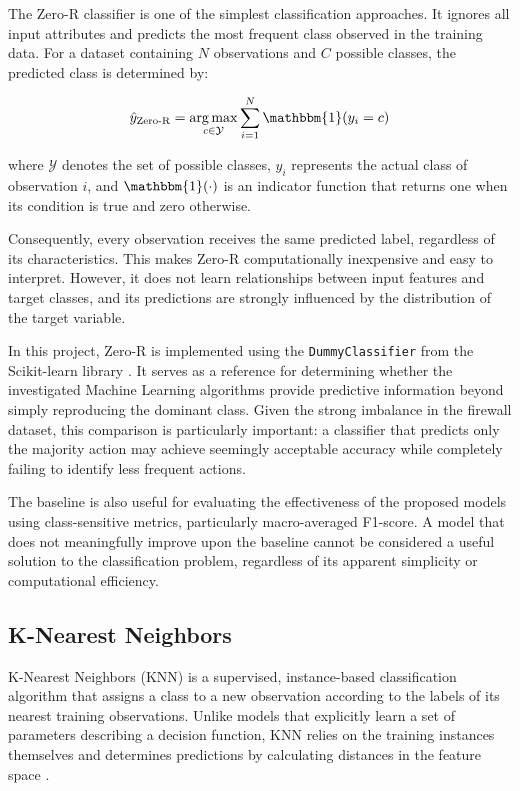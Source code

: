 The Zero-R classifier is one of the simplest classification approaches. It ignores all input attributes and predicts the most frequent class observed in the training data. For a dataset containing $N$ observations and $C$ possible classes, the predicted class is determined by:

\begin{equation}
    \hat{y}_{\text{Zero-R}}
    =
    \underset{c \in \mathcal{Y}}{\arg\max}
    \sum_{i=1}^{N}\mathbbm{1}(y_i=c)
    \label{eq:zero-r}
\end{equation}

where $\mathcal{Y}$ denotes the set of possible classes, $y_i$ represents the actual class of observation $i$, and $\mathbbm{1}(\cdot)$ is an indicator function that returns one when its condition is true and zero otherwise.

Consequently, every observation receives the same predicted label, regardless of its characteristics. This makes Zero-R computationally inexpensive and easy to interpret. However, it does not learn relationships between input features and target classes, and its predictions are strongly influenced by the distribution of the target variable.

In this project, Zero-R is implemented using the \texttt{DummyClassifier} from the Scikit-learn library \cite{pedregosa2011scikit}. It serves as a reference for determining whether the investigated Machine Learning algorithms provide predictive information beyond simply reproducing the dominant class. Given the strong imbalance in the firewall dataset, this comparison is particularly important: a classifier that predicts only the majority action may achieve seemingly acceptable accuracy while completely failing to identify less frequent actions.

The baseline is also useful for evaluating the effectiveness of the proposed models using class-sensitive metrics, particularly macro-averaged F1-score. A model that does not meaningfully improve upon the baseline cannot be considered a useful solution to the classification problem, regardless of its apparent simplicity or computational efficiency.

\subsection{K-Nearest Neighbors}

K-Nearest Neighbors (KNN) is a supervised, instance-based classification algorithm that assigns a class to a new observation according to the labels of its nearest training observations. Unlike models that explicitly learn a set of parameters describing a decision function, KNN relies on the training instances themselves and determines predictions by calculating distances in the feature space \cite{cover1967nearest}.

